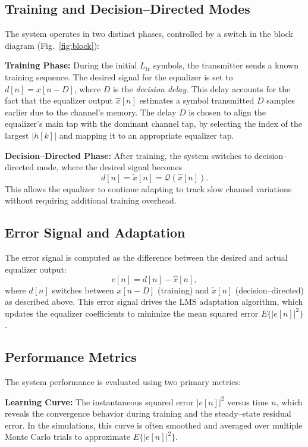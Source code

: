 \documentclass[12pt]{article}
\begin{document}
\subsection{Training and Decision--Directed Modes}
The system operates in two distinct phases, controlled by a switch in the block diagram (Fig.~\ref{fig:block}):

\textbf{Training Phase:} During the initial $L_{\text{tr}}$ symbols, the transmitter sends a known training sequence. The desired signal for the equalizer is set to $d[n] = x[n-D]$, where $D$ is the \emph{decision delay}. This delay accounts for the fact that the equalizer output $\hat{x}[n]$ estimates a symbol transmitted $D$ samples earlier due to the channel's memory. The delay $D$ is chosen to align the equalizer's main tap with the dominant channel tap, by selecting the index of the largest $|h[k]|$ and mapping it to an appropriate equalizer tap.

\textbf{Decision--Directed Phase:} After training, the system switches to decision--directed mode, where the desired signal becomes
\begin{equation}
d[n] = \tilde{x}[n] = \mathcal{Q}(\hat{x}[n]).
\end{equation}
This allows the equalizer to continue adapting to track slow channel variations without requiring additional training overhead.

\subsection{Error Signal and Adaptation}
The error signal is computed as the difference between the desired and actual equalizer output:
\begin{equation}
e[n] = d[n] - \hat{x}[n],
\end{equation}
where $d[n]$ switches between $x[n-D]$ (training) and $\tilde{x}[n]$ (decision--directed) as described above. This error signal drives the LMS adaptation algorithm, which updates the equalizer coefficients to minimize the mean squared error $E\{|e[n]|^2\}$.

\subsection{Performance Metrics}
The system performance is evaluated using two primary metrics:

\textbf{Learning Curve:} The instantaneous squared error $|e[n]|^2$ versus time $n$, which reveals the convergence behavior during training and the steady--state residual error. In the simulations, this curve is often smoothed and averaged over multiple Monte Carlo trials to approximate $E\{|e[n]|^2\}$.
\end{document}

